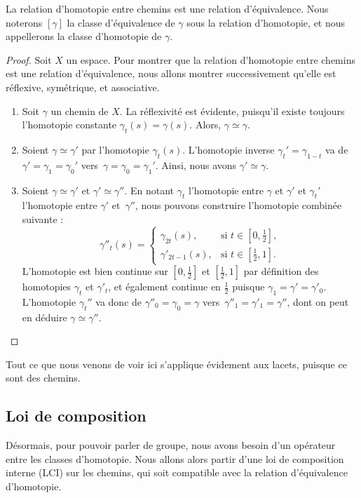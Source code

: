 \begin{proposition}
La relation d'homotopie entre chemins est une relation d'équivalence. Nous noterons $[\gamma]$ la classe d'équivalence de $\gamma$ sous la relation d'homotopie, et nous appellerons la classe d'homotopie de $\gamma$.
\end{proposition}
\begin{proof}
Soit $X$ un espace. Pour montrer que la relation d'homotopie entre chemins est une relation d'équivalence, nous allons montrer successivement qu'elle est réflexive, symétrique, et associative.\begin{enumerate}
    \item Soit $\gamma$ un chemin de $X$. La réflexivité est évidente, puisqu'il existe toujours l'homotopie constante $\gamma_t(s)=\gamma(s)$. Alors, $\gamma\simeq\gamma$.
    \item Soient $\gamma\simeq\gamma'$ par l'homotopie $\gamma_t(s)$. L'homotopie inverse $\gamma_t'=\gamma_{1-t}$ va de $\gamma'=\gamma_1=\gamma_0'$ vers~$\gamma=\gamma_0=\gamma_1'$. Ainsi, nous avons $\gamma'\simeq\gamma$.
    \item Soient $\gamma\simeq\gamma'$ et $\gamma'\simeq\gamma''$. En notant $\gamma_t$ l'homotopie entre $\gamma$ et $\gamma'$ et $\gamma_t'$ l'homotopie entre $\gamma'$ et~$\gamma''$, nous pouvons construire l'homotopie combinée suivante : \[\gamma''_t(s)= \left\{\begin{matrix}
\gamma_{2t}(s),&\text{si }t\in[0,\frac{1}{2}], \\
\gamma'_{2t-1}(s),&\text{si }t\in[\frac{1}{2},1].
\end{matrix}\right.\]L'homotopie est bien continue sur $[0,\frac{1}{2}]$ et $[\frac{1}{2},1]$ par définition des homotopies $\gamma_t$ et $\gamma'_t$, et également continue en $\frac{1}{2}$ puisque $\gamma_1=\gamma'=\gamma'_0$. L'homotopie $\gamma_t''$ va donc de $\gamma''_0=\gamma_0=\gamma$ vers~$\gamma''_1=\gamma'_1=\gamma''$, dont on peut en déduire $\gamma\simeq\gamma''$.
\end{enumerate}
\end{proof}

Tout ce que nous venons de voir ici s'applique évidement aux lacets, puisque ce sont des chemins.

\subsection{Loi de composition}

Désormais, pour pouvoir parler de groupe, nous avons besoin d'un opérateur entre les classes d'homotopie. Nous allons alors partir d'une loi de composition interne (LCI) sur les chemins, qui soit compatible avec la relation d'équivalence d'homotopie.

